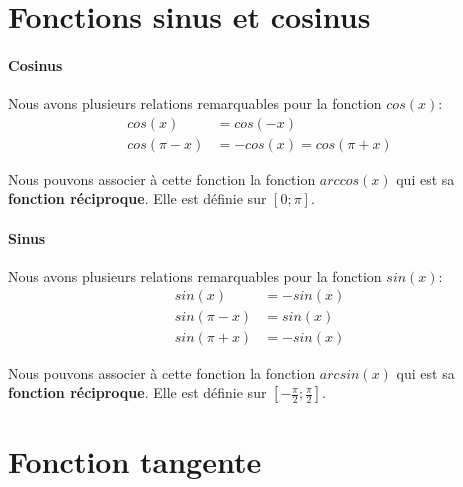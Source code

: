 \documentclass[12pt,a4paper,openany]{book}
\begin{document}
\section{Fonctions sinus et cosinus}

\paragraph{Cosinus} Nous avons plusieurs relations remarquables pour la fonction $ cos(x) $:
\begin{align}
cos(x) & = cos(-x)\\
cos(\pi - x) & = -cos(x) = cos(\pi + x)
\end{align}

Nous pouvons associer à cette fonction la fonction \textbf{$ arccos(x) $} qui est sa \textbf{fonction réciproque}. Elle est définie sur $ [0; \pi] $.

\paragraph{Sinus} Nous avons plusieurs relations remarquables pour la fonction $ sin(x) $:
\begin{align}
sin(x) & = -sin(x)\\
sin(\pi - x) & = sin(x)\\
sin(\pi + x) & = -sin(x)
\end{align}

Nous pouvons associer à cette fonction la fonction \textbf{$ arcsin(x) $} qui est sa \textbf{fonction réciproque}. Elle est définie sur $ [-\frac{\pi}{2}; \frac{\pi}{2}] $.

\section{Fonction tangente}
\end{document}
